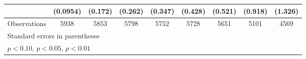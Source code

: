 \begin{table}[htbp]
\begin{tabular}{l*{8}{c}}
                    &    (0.0954)         &     (0.172)         &     (0.262)         &     (0.347)         &     (0.428)         &     (0.521)         &     (0.918)         &     (1.326)         \\
\hline
Observations        &        5938         &        5853         &        5798         &        5752         &        5728         &        5651         &        5101         &        4569         \\
\hline\hline
\multicolumn{9}{l}{\footnotesize Standard errors in parentheses}\\
\multicolumn{9}{l}{\footnotesize \sym{*} \(p<0.10\), \sym{**} \(p<0.05\), \sym{***} \(p<0.01\)}\\
\end{tabular}
\end{table}

